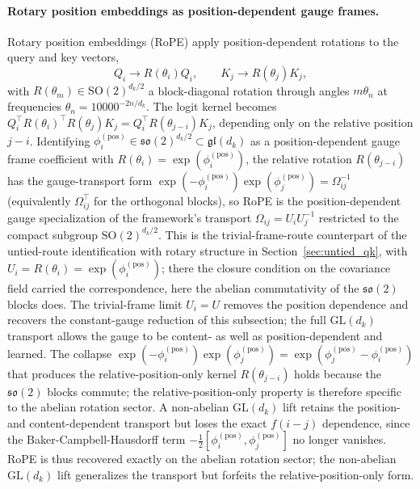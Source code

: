 \paragraph{Rotary position embeddings as position-dependent gauge frames.}
Rotary position embeddings (RoPE) \cite{su2024roformer} apply position-dependent rotations to the query and key vectors,
\begin{equation}
Q_i \to R(\theta_i) Q_i, \qquad K_j \to R(\theta_j) K_j,
\label{eq:rope_apply}
\end{equation}
with $R(\theta_m) \in \mathrm{SO}(2)^{d_k/2}$ a block-diagonal rotation through angles $m\theta_n$ at frequencies $\theta_n = 10000^{-2n/d_k}$. The logit kernel becomes $Q_i^\top R(\theta_i)^\top R(\theta_j) K_j = Q_i^\top R(\theta_{j-i}) K_j$, depending only on the relative position $j - i$. Identifying $\phi_i^{(\mathrm{pos})} \in \mathfrak{so}(2)^{d_k/2} \subset \mathfrak{gl}(d_k)$ as a position-dependent gauge frame coefficient with $R(\theta_i) = \exp(\phi_i^{(\mathrm{pos})})$, the relative rotation $R(\theta_{j-i})$ has the gauge-transport form $\exp(-\phi_i^{(\mathrm{pos})})\exp(\phi_j^{(\mathrm{pos})}) = \Omega_{ij}^{-1}$ (equivalently $\Omega_{ij}^\top$ for the orthogonal blocks), so RoPE is the position-dependent gauge specialization of the framework's transport $\Omega_{ij} = U_iU_j^{-1}$ restricted to the compact subgroup $\mathrm{SO}(2)^{d_k/2}$. This is the trivial-frame-route counterpart of the untied-route identification with rotary structure in Section~\ref{sec:untied_qk}, with $U_i = R(\theta_i) = \exp(\phi_i^{(\mathrm{pos})})$; there the closure condition on the covariance field carried the correspondence, here the abelian commutativity of the $\mathfrak{so}(2)$ blocks does. The trivial-frame limit $U_i = U$ removes the position dependence and recovers the constant-gauge reduction of this subsection; the full $\mathrm{GL}(d_k)$ transport allows the gauge to be content- as well as position-dependent and learned. The collapse $\exp(-\phi_i^{(\mathrm{pos})})\exp(\phi_j^{(\mathrm{pos})}) = \exp(\phi_j^{(\mathrm{pos})} - \phi_i^{(\mathrm{pos})})$ that produces the relative-position-only kernel $R(\theta_{j-i})$ holds because the $\mathfrak{so}(2)$ blocks commute; the relative-position-only property is therefore specific to the abelian rotation sector. A non-abelian $\mathrm{GL}(d_k)$ lift retains the position- and content-dependent transport but loses the exact $f(i-j)$ dependence, since the Baker-Campbell-Hausdorff term $-\tfrac{1}{2}[\phi_i^{(\mathrm{pos})}, \phi_j^{(\mathrm{pos})}]$ no longer vanishes. RoPE is thus recovered exactly on the abelian rotation sector; the non-abelian $\mathrm{GL}(d_k)$ lift generalizes the transport but forfeits the relative-position-only form.

